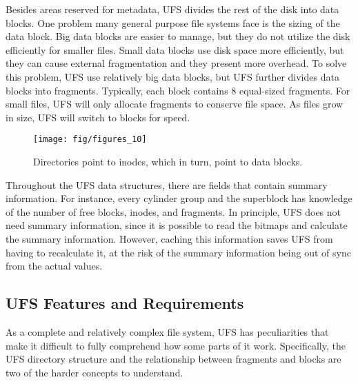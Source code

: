 Besides areas reserved for metadata, UFS divides the rest of the disk into
data blocks. One problem many general purpose file systems face is the sizing
of the data block. Big data blocks are easier to manage, but they do not
utilize the disk efficiently for smaller files. Small data blocks use disk
space more efficiently, but they can cause external fragmentation and they
present more overhead. To solve this problem, UFS use relatively big data
blocks, but UFS further divides data blocks into fragments. Typically, each
block contains 8 equal-sized fragments. For small files, UFS will only
allocate fragments to conserve file space. As files grow in size, UFS will
switch to blocks for speed.

\begin{figure}[htb]
  \centering
  \texttt{[image: fig/figures\_10]}
  \caption{\label{fig:ufs_data} Directories point to inodes, which in turn,
	  point to data blocks.}
\end{figure}

Throughout the UFS data structures, there are fields that contain summary
information. For instance, every cylinder group and the superblock has
knowledge of the number of free blocks, inodes, and fragments. In principle,
UFS does not need summary information, since it is possible to read the bitmaps
and calculate the summary information. However, caching this information saves
UFS from having to recalculate it, at the risk of the summary information
being out of sync from the actual values.


\subsection{UFS Features and Requirements}
\label{sec:ufs:features}

As a complete and relatively complex file system, UFS has peculiarities that
make it difficult to fully comprehend how some parts of it work. Specifically,
the UFS directory structure and the relationship between fragments and blocks
are two of the harder concepts to understand.


